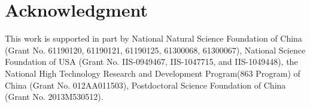 \documentclass[journal]{IEEEtran}
\begin{document}
%
%
%
%


\section*{Acknowledgment}
This work is supported in part by National Natural Science Foundation of China (Grant No. 61190120, 61190121, 61190125, 61300068, 61300067), National Science Foundation of USA (Grant No. IIS-0949467, IIS-1047715, and IIS-1049448), the National High Technology Research and Development Program(863 Program) of China (Grant No. 012AA011503), Postdoctoral Science Foundation of China (Grant No. 2013M530512).


\ifCLASSOPTIONcaptionsoff
  \newpage
\fi




\end{document}
